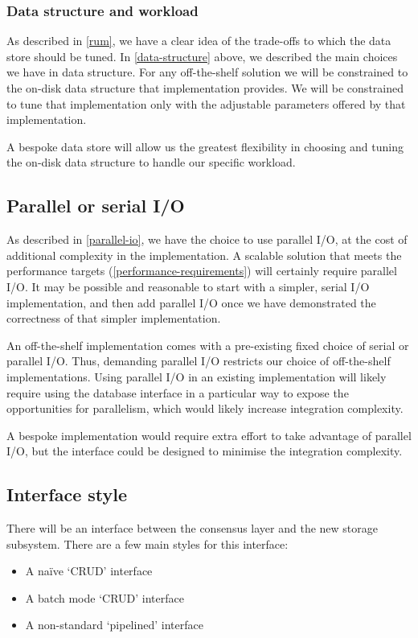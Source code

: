 \documentclass[11pt,a4paper]{article}
\begin{document}
\subsubsection{Data structure and workload}

As described in \cref{rum}, we have a clear idea of the trade-offs to which the
data store should be tuned. In \cref{data-structure} above, we described the
main choices we have in data structure. For any off-the-shelf solution we will
be constrained to the on-disk data structure that implementation provides. We
will be constrained to tune that implementation only with the adjustable
parameters offered by that implementation.

A bespoke data store will allow us the greatest flexibility in choosing and
tuning the on-disk data structure to handle our specific workload.

\subsection{Parallel or serial I/O}

As described in \cref{parallel-io}, we have the choice to use parallel I/O,
at the cost of additional complexity in the implementation. A scalable solution
that meets the performance targets (\cref{performance-requirements})
will certainly require parallel I/O. It may be possible and reasonable to start
with a simpler, serial I/O implementation, and then add parallel I/O once we
have demonstrated the correctness of that simpler implementation.

An off-the-shelf implementation comes with a pre-existing fixed choice of
serial or parallel I/O. Thus, demanding parallel I/O restricts our choice of
off-the-shelf implementations. Using parallel I/O in an existing implementation
will likely require using the database interface in a particular way to expose
the opportunities for parallelism, which would likely increase integration
complexity.

A bespoke implementation would require extra effort to take advantage of
parallel I/O, but the interface could be designed to minimise the integration
complexity.

\subsection{Interface style}
\label{interface-style}

There will be an interface between the consensus layer and the new storage
subsystem. There are a few main styles for this interface:
\begin{itemize}
\setlength{\itemsep}{0pt}%
\setlength{\parskip}{1pt}%
\item A na\"ive `CRUD' interface
\item A batch mode `CRUD' interface
\item A non-standard `pipelined' interface
\end{itemize}
\end{document}
